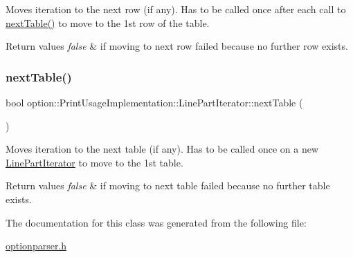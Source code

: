 Moves iteration to the next row (if any). Has to be called once after each call to \hyperlink{classoption_1_1_print_usage_implementation_1_1_line_part_iterator_afe43ca12d399ed3c871e4dc5bf63356e}{next\+Table()} to move to the 1st row of the table. 


\begin{DoxyRetVals}{Return values}
{\em false} & if moving to next row failed because no further row exists. \\
\hline
\end{DoxyRetVals}
\mbox{\label{classoption_1_1_print_usage_implementation_1_1_line_part_iterator_afe43ca12d399ed3c871e4dc5bf63356e}} 
\subsubsection{\texorpdfstring{next\+Table()}{nextTable()}}
{\footnotesize\ttfamily bool option\+::\+Print\+Usage\+Implementation\+::\+Line\+Part\+Iterator\+::next\+Table (\begin{DoxyParamCaption}{ }\end{DoxyParamCaption})\hspace{0.3cm}{\ttfamily [inline]}}



Moves iteration to the next table (if any). Has to be called once on a new \hyperlink{classoption_1_1_print_usage_implementation_1_1_line_part_iterator}{Line\+Part\+Iterator} to move to the 1st table. 


\begin{DoxyRetVals}{Return values}
{\em false} & if moving to next table failed because no further table exists. \\
\hline
\end{DoxyRetVals}


The documentation for this class was generated from the following file\+:\begin{DoxyCompactItemize}
\item 
\hyperlink{optionparser_8h}{optionparser.\+h}\end{DoxyCompactItemize}

